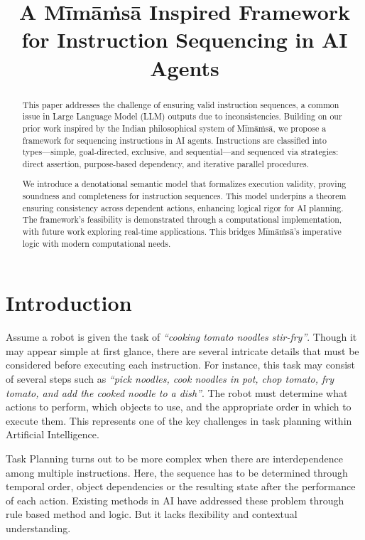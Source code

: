 \documentclass[a4paper,11pt]{lmcs}
\title{A M\={i}m\={a}\.{m}s\={a} Inspired Framework for Instruction Sequencing in AI Agents}
\author{}
\newcommand{\mimamsa}{M\={i}m\={a}\.ms\={a}}
\begin{document}
\maketitle

\begin{abstract}
This paper addresses the challenge of ensuring valid instruction sequences, a common issue in Large Language Model (LLM) outputs due to inconsistencies. Building on our prior work inspired by the Indian philosophical system of \mimamsa, we propose a framework for sequencing instructions in AI agents. Instructions are classified into types—simple, goal-directed, exclusive, and sequential—and sequenced via strategies: direct assertion, purpose-based dependency, and iterative parallel procedures.

We introduce a denotational semantic model that formalizes execution validity, proving soundness and completeness for instruction sequences. This model underpins a theorem ensuring consistency across dependent actions, enhancing logical rigor for AI planning. The framework’s feasibility is demonstrated through a computational implementation, with future work exploring real-time applications. This bridges \mimamsa's imperative logic with modern computational needs.
\end{abstract}

\section{Introduction}
Assume a robot is given the task of \textit{``cooking tomato noodles stir-fry''}. Though it may appear simple at first glance, there are several intricate details that must be considered before executing each instruction. For instance, this task may consist of several steps such as \textit{``pick noodles, cook noodles in pot, chop tomato, fry tomato, and add the cooked noodle to a dish''}. The robot must determine what actions to perform, which objects to use, and the appropriate order in which to execute them. This represents one of the key challenges in task planning within Artificial Intelligence.

Task Planning turns out to be more complex when there are interdependence among multiple instructions. Here, the sequence has to be determined through temporal order, object dependencies or the resulting state after the performance of each action. Existing methods in AI have addressed these problem through rule based method and logic. But it lacks flexibility and contextual understanding.
\end{document}
